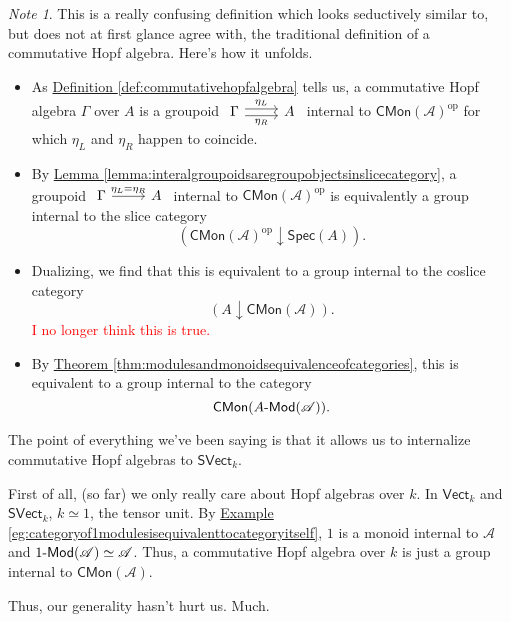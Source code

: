 \documentclass[a4paper]{report}
\def\mhyp{{\hbox{-}}}
\theoremstyle{definition}
\theoremstyle{plain}
\theoremstyle{remark}
\newtheorem{note}{Note}[section]
\begin{document}
\begin{note}
  This is a really confusing definition which looks seductively similar to, but does not at first glance agree with, the traditional definition of a commutative Hopf algebra. Here's how it unfolds.


  \begin{itemize}
    \item As \hyperref[def:commutativehopfalgebra]{Definition \ref*{def:commutativehopfalgebra}} tells us, a commutative Hopf algebra $\Gamma$ over $A$ is a groupoid $\begin{tikzcd} \Gamma \arrow[r, shift left, "\eta_{L}"] \arrow[r, shift right, swap, "\eta_{R}"] & A \end{tikzcd}$ internal to $\mathsf{CMon}(\mathscr{A})^{\mathrm{op}}$ for which $\eta_{L}$ and $\eta_{R}$ happen to coincide.

    \item By \hyperref[lemma:interalgroupoidsaregroupobjectsinslicecategory]{Lemma \ref*{lemma:interalgroupoidsaregroupobjectsinslicecategory}}, a groupoid $\begin{tikzcd} \Gamma \arrow[r, "\eta_{L} = \eta_{R}"] & A \end{tikzcd}$ internal to $\mathsf{CMon}(\mathscr{A})^{\mathrm{op}}$ is equivalently a group internal to the slice category
      \begin{equation*}
        (\mathsf{CMon}(\mathscr{A})^{\mathrm{op}} \downarrow \mathsf{Spec}(A)).
      \end{equation*}

    \item Dualizing, we find that this is equivalent to a group internal to the coslice category
      \begin{equation*}
        (A \downarrow \mathsf{CMon}(\mathscr{A})).
      \end{equation*}
      \textcolor{red}{I no longer think this is true.}

    \item By \hyperref[thm:modulesandmonoidsequivalenceofcategories]{Theorem \ref*{thm:modulesandmonoidsequivalenceofcategories}}, this is equivalent to a group internal to the category 
      \begin{equation*}
        \mathsf{CMon}(A\mhyp\mathsf{Mod}(\mathscr{A})).
      \end{equation*}
  \end{itemize}

  The point of everything we've been saying is that it allows us to internalize commutative Hopf algebras to $\mathsf{SVect}_{k}$.

  First of all, (so far) we only really care about Hopf algebras over $k$. In $\mathsf{Vect}_{k}$ and $\mathsf{SVect}_{k}$, $k \simeq 1$, the tensor unit. By \hyperref[eg:categoryof1modulesisequivalenttocategoryitself]{Example \ref*{eg:categoryof1modulesisequivalenttocategoryitself}}, $1$ is a monoid internal to $\mathscr{A}$ and $1\mhyp\mathsf{Mod}(\mathscr{A}) \simeq \mathscr{A}$. Thus, a commutative Hopf algebra over $k$ is just a group internal to $\mathsf{CMon}(\mathscr{A})$.

  Thus, our generality hasn't hurt us. Much.
\end{note}
\end{document}
